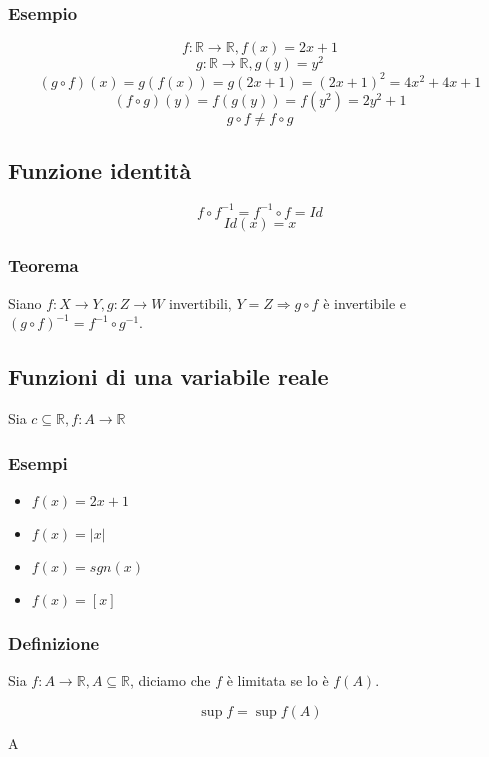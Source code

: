 \subsubsection*{Esempio}
\begin{Large}
    \[
        f : \mathbb{R} \rightarrow \mathbb{R}, f(x) = 2x + 1
    \]
    \[
        g : \mathbb{R} \rightarrow \mathbb{R}, g(y) = y^{2}
    \]
    \[
        (g \circ f)(x) = g(f(x)) = g(2x + 1) = {(2x + 1)}^{2} = 4x^{2} + 4x +1    
    \]
    \[
        (f \circ g)(y) = f(g(y)) = f(y^{2}) = 2y^{2} + 1
    \]
    \[
        g \circ f \neq f \circ g    
    \]
\end{Large}
\subsection{Funzione identità}
\begin{Large}
\[
    f \circ f^{-1} = f^{-1} \circ f = Id    
\]
\[
    Id(x) = x    
\]
\end{Large}
\subsubsection*{Teorema}
Siano $f: X \rightarrow Y, g: Z \rightarrow W$ invertibili, $Y = Z \Rightarrow g \circ f$ è invertibile 
e ${(g \circ f)}^{-1} = f^{-1} \circ g^{-1}$.

\subsection{Funzioni di una variabile reale}
Sia $c \subseteq \mathbb{R}, f:A \rightarrow \mathbb{R}$
\subsubsection*{Esempi}
\begin{itemize}
\item $f(x) = 2x + 1$
\item $f(x) = |x|$
\item $f(x) = sgn(x)$
\item $f(x) = [x]$
\end{itemize}
\subsubsection*{Definizione}
Sia $f:A\rightarrow \mathbb{R}, A \subseteq \mathbb{R}$, diciamo che $f$ è limitata se lo è $f(A)$.
\begin{Large}
\[
    \sup{f} = \sup{f(A)}    
\]
\end{Large}
\vspace{-7.5ex}
\begin{center}
\begin{small}
    \hspace{0.7cm}A
\end{small}
\end{center}

